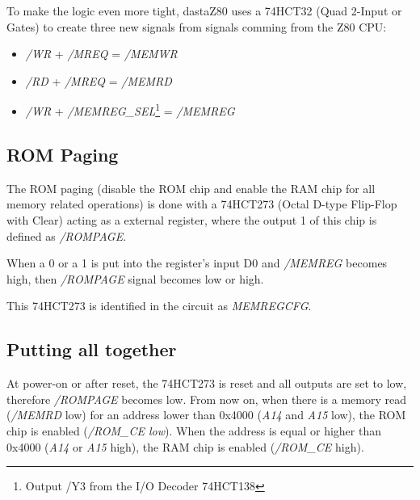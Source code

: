 \documentclass[a4paper,11pt]{article}
\begin{document}
    To make the logic even more tight, dastaZ80 uses a 74HCT32 (Quad 2-Input or
    Gates) to create three new signals from signals comming from the Z80 CPU:

    \begin{itemize}
        \item \textit{/WR} + \textit{/MREQ} = \textit{/MEMWR}
        \item \textit{/RD} + \textit{/MREQ} = \textit{/MEMRD}
        \item \textit{/WR} + \textit{/MEMREG\_SEL}\footnote{Output /Y3 from the
        I/O Decoder 74HCT138} = \textit{/MEMREG}
    \end{itemize}

    \subsection{ROM Paging}
    \label{rom_paging}

    The ROM paging (disable the ROM chip and enable the RAM chip for all memory
    related operations) is done with a 74HCT273 (Octal D-type Flip-Flop with
    Clear) acting as a external register, where the output 1 of this chip is 
    defined as \textit{/ROMPAGE}.

    When a 0 or a 1 is put into the register's input D0 and \textit{/MEMREG} 
    becomes high, then \textit{/ROMPAGE} signal becomes low or high.
    
    This 74HCT273 is identified in the circuit as \textit{MEMREGCFG}.
    
    \subsection{Putting all together}
    
    At power-on or after reset, the 74HCT273 is reset and all outputs are set to
    low, therefore \textit{/ROMPAGE} becomes low. From now on, when there is a
    memory read (\textit{/MEMRD} low) for an address lower than 0x4000
    (\textit{A14} and \textit{A15} low), the ROM chip is enabled
    (\textit{/ROM\_CE low}). When the address is equal or higher than 0x4000
    (\textit{A14} or \textit{A15} high), the RAM chip is enabled
    (\textit{/ROM\_CE} high).
\end{document}
